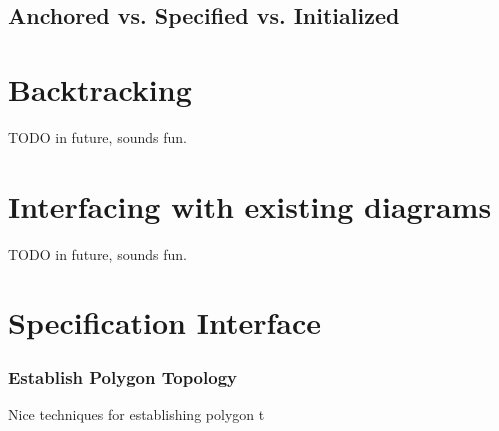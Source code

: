 \subsection{Anchored vs. Specified vs. Initialized}

\section{Backtracking}

TODO in future, sounds fun.

\section{Interfacing with existing diagrams}

TODO in future, sounds fun.

\section{Specification Interface}

\subsubsection{Establish Polygon Topology}

Nice techniques for establishing polygon t
